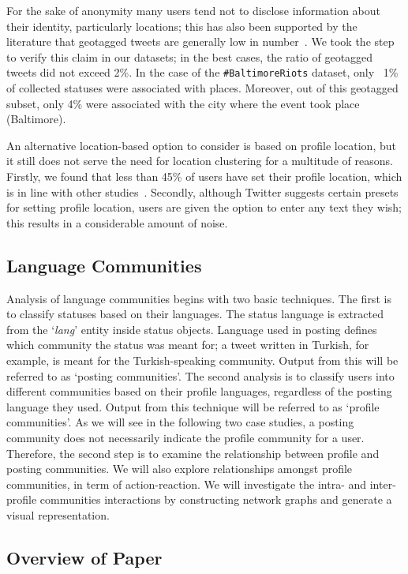 For the sake of anonymity many users tend not to disclose information
about their identity, particularly locations; this has also been
supported by the literature that geotagged tweets are generally low in
number~\cite{kang-et-al:2013}. We took the step to verify this claim in 
our datasets; in the best cases, the ratio of geotagged tweets did
not exceed 2\%. In the case of the {\texttt{\#BaltimoreRiots}}
dataset, only ~1\% of collected statuses were associated with
places. Moreover, out of this geotagged subset, only 4\% were
associated with the city where the event took place (Baltimore).

An alternative location-based option to consider is based on profile
location, but it still does not serve the need for location clustering
for a multitude of reasons. Firstly, we found that less than 45\% of
users have set their profile location, which is in line with other
studies~\cite{graham-et-al:2014}. Secondly, although Twitter suggests
certain presets for setting profile location, users are given the
option to enter any text they wish; this results in a considerable
amount of noise.

\subsection{Language Communities}\label{langcomm}

Analysis of language communities begins with two basic techniques. The
first is to classify statuses based on their languages. The status
language is extracted from the `{\emph{lang}}' entity inside status
objects. Language used in posting defines which community the status
was meant for; a tweet written in Turkish, for example, is meant for
the Turkish-speaking community. Output from this will be referred to
as `posting communities'. The second analysis is to classify users
into different communities based on their profile languages,
regardless of the posting language they used. Output from this
technique will be referred to as `profile communities'. As we will see
in the following two case studies, a posting community does not
necessarily indicate the profile community for a user. Therefore, the
second step is to examine the relationship between profile and posting
communities. We will also explore relationships amongst profile
communities, in term of action-reaction. We will investigate the
intra- and inter-profile communities interactions by constructing
network graphs and generate a visual representation.

\subsection{Overview of Paper}


